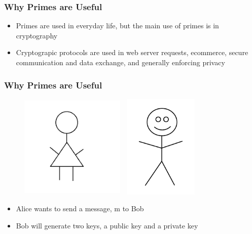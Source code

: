 \documentclass{beamer}
\begin{document}
\begin{frame}
\frametitle{Why Primes are Useful}
\begin{itemize}
    \item Primes are used in everyday life, but the main use of primes is in cryptography
    \item Cryptograpic protocols are used in web server requests, ecommerce, secure communication and data exchange, and generally enforcing privacy
\end{itemize}
    
\end{frame}

\begin{frame}
\frametitle{Why Primes are Useful}
    \begin{figure}
        \centering
        \includegraphics[width=5cm, height=5cm]{alice.png}
        \includegraphics[width=4cm, height=5cm]{bob.png}
    \end{figure}
    \begin{itemize}
        \item Alice wants to send a message, m to Bob
        \item Bob will generate two keys, a public key and a private key
    \end{itemize}
\end{frame}
\end{document}
